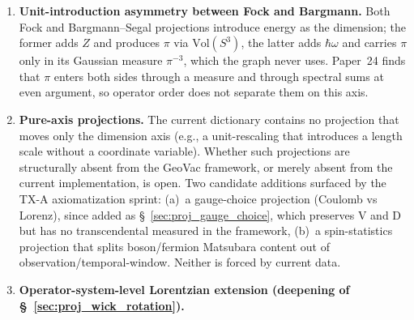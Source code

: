 \documentclass[11pt]{article}
\begin{document}
\begin{enumerate}
\textit{Track TS-C update (2026-05-04).} The ``depth model
under-counts'' reading was tested by examining whether the three
chains share a fourth implicit projection.  They do not: $F$ is
derived from a Dirichlet zeta on the $(n,l)$ lattice with no Hopf
invocation (Phase~4F $\alpha$-J); $\Delta^{-1}$ is a
Camporesi--Higuchi Dirac mode degeneracy with no Hopf invocation
(Phase~4H SM-D); and the Hopf-quotient graph at $n_{\max} = 3$ does
not encode $K$ through any independent spectral invariant beyond
a Casimir relabeling (Phase~4B $\alpha$-D).  The outer $\pi$
prefactor of $K$ is a chosen step of the combination rule (Paper~2),
not a projection output, so it adds no projection to the chain.  Under-counting is therefore not
the mechanism.  Combined with the K-CC clean negative on a unified
Connes--Chamseddine spectral-action source, twelve mechanisms total
have been eliminated.  The remaining live readings are (ii) and
(iii) above; the standing interpretation is (iii), per WH5.

\item \textbf{Unit-introduction asymmetry between Fock and Bargmann.}
Both Fock and Bargmann--Segal projections introduce energy as the
dimension; the former adds $Z$ and produces $\pi$ via
$\mathrm{Vol}(S^3)$, the latter adds $\hbar\omega$ and carries
$\pi$ only in its Gaussian measure $\pi^{-3}$, which the graph never
uses.  Paper~24 finds that $\pi$ enters both sides through a measure
and through spectral sums at even argument, so operator order does
not separate them on this axis.

\item \textbf{Pure-axis projections.}  The current dictionary contains
no projection that moves only the dimension axis (e.g., a
unit-rescaling that introduces a length scale without a coordinate
variable).  Whether such projections are structurally absent from the
GeoVac framework, or merely absent from the current implementation,
is open.  Two candidate additions surfaced by the TX-A axiomatization
sprint: (a)~a gauge-choice projection (Coulomb vs Lorenz), since added
as \S~\ref{sec:proj_gauge_choice}, which preserves V and D but has no
transcendental measured in the framework, (b)~a
spin-statistics projection that splits boson/fermion Matsubara
content out of observation/temporal-window.  Neither is forced by
current data.

\item \textbf{Operator-system-level Lorentzian extension (deepening
of \S~\ref{sec:proj_wick_rotation}).}


\end{enumerate}
\end{document}
